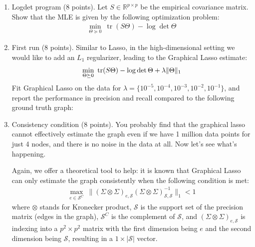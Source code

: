 \documentclass{article}
\begin{document}
\begin{enumerate}
\item 
Logdet program (8 points). 
Let $ S \in \mathbb{R}^{p \times p} $ be the empirical covariance matrix. 
Show that the MLE is given by the following optimization problem:
\begin{align}
\min_{\Theta \succeq 0} \  \mathop{\mathrm{tr}} (S \Theta) - \log \det \Theta 
\end{align}

\item 
First run (8 points). 
Similar to Lasso, in the high-dimensional setting we would like to add an $ L_1 $ regularizer, leading to the Graphical Lasso estimate: 
\begin{align}
\min_{\Theta \succeq 0} \  \textnormal{tr} (S \Theta) - \log \det \Theta + \lambda \| \Theta \|_1
\end{align}
Fit Graphical Lasso on the data for $\lambda = \{10^{-5}, 10^{-4}, 10^{-3}, 10^{-2}, 10^{-1} \}$, and report the performance in precision and recall compared to the following ground truth graph:
\begin{center}
\end{center}



\item 
Consistency condition (8 points). 
You probably find that the graphical lasso cannot effectively estimate the graph even if we have 1 million data points for just 4 nodes, and there is no noise in the data at all. Now let's see what's happening. 

Again, we offer a theoretical tool to help: it is known that Graphical Lasso can only estimate the graph consistently when the following condition is met: 
\begin{align}
\max_{e\in \mathcal{S}^C} \ \|(\Sigma \otimes \Sigma)_{e, \mathcal{S}}(\Sigma \otimes \Sigma)_{\mathcal{S}, \mathcal{S}}^{-1} \|_1 < 1
\end{align}
where $\otimes$ stands for Kronecker product, $\mathcal{S}$ is the support set of the precision matrix (edges in the graph), $\mathcal{S}^C$ is the complement of $\mathcal{S}$, and $(\Sigma \otimes \Sigma)_{e, \mathcal{S}}$ is indexing into a $ p^2 \times p^2 $ matrix with the first dimension being $e$ and the second dimension being $\mathcal{S}$, resulting in a $ 1\times |\mathcal{S}|$ vector.



\end{enumerate}
\end{document}
